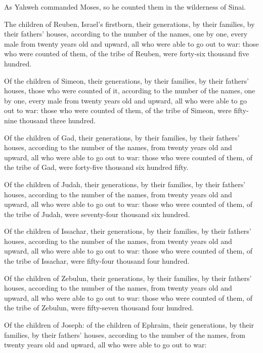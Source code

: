{As Yahweh commanded Moses, so he counted them in the wilderness of Sinai.
\par }{\PP {}The children of Reuben, Israel’s firstborn, their generations, by their families, by their fathers’ houses, according to the number of the names, one by one, every male from twenty years old and upward, all who were able to go out to war:
those who were counted of them, of the tribe of Reuben, were forty-six thousand five hundred.
\par }{\PP {}Of the children of Simeon, their generations, by their families, by their fathers’ houses, those who were counted of it, according to the number of the names, one by one, every male from twenty years old and upward, all who were able to go out to war:
those who were counted of them, of the tribe of Simeon, were fifty-nine thousand three hundred.
\par }{\PP {}Of the children of Gad, their generations, by their families, by their fathers’ houses, according to the number of the names, from twenty years old and upward, all who were able to go out to war:
those who were counted of them, of the tribe of Gad, were forty-five thousand six hundred fifty.
\par }{\PP {}Of the children of Judah, their generations, by their families, by their fathers’ houses, according to the number of the names, from twenty years old and upward, all who were able to go out to war:
those who were counted of them, of the tribe of Judah, were seventy-four thousand six hundred.
\par }{\PP {}Of the children of Issachar, their generations, by their families, by their fathers’ houses, according to the number of the names, from twenty years old and upward, all who were able to go out to war:
those who were counted of them, of the tribe of Issachar, were fifty-four thousand four hundred.
\par }{\PP {}Of the children of Zebulun, their generations, by their families, by their fathers’ houses, according to the number of the names, from twenty years old and upward, all who were able to go out to war:
those who were counted of them, of the tribe of Zebulun, were fifty-seven thousand four hundred.
\par }{\PP {}Of the children of Joseph: of the children of Ephraim, their generations, by their families, by their fathers’ houses, according to the number of the names, from twenty years old and upward, all who were able to go out to war:
}

